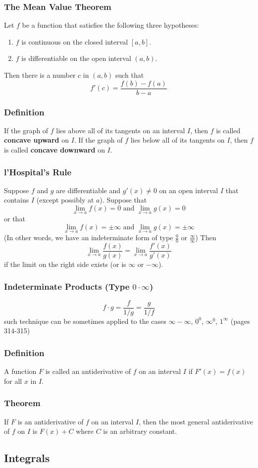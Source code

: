 \documentclass{article}
\begin{document}
\subsubsection*{The Mean Value Theorem}
Let \(f\) be a function that satisfies the following three hypotheses:
\begin{enumerate}
  \item \(f\) is continuous on the closed interval \([a,b]\).
  \item \(f\) is differentiable on the open interval \((a,b)\).
\end{enumerate}
Then there is a number \(c\) in \((a,b)\) such that 
\[
f'(c) = \frac{f(b)-f(a)}{b-a}
\]

\subsubsection*{Definition}
If the graph of \(f\) lies above all of its tangents on an interval \(I\), then \(f\) is called \textbf{concave upward} on \(I\). If the graph of \(f\) lies below all of its tangents on \(I\), then \(f\) is called \textbf{concave downward} on \(I\).

\subsubsection*{l’Hospital’s Rule}
Suppose \(f\) and \(g\) are differentiable and \(g'(x) \neq 0 \) on an open interval \(I\) that contains \(I\) (except possibly at \(a\)). Suppose that
\[
\lim_{x \to a} f(x) = 0 \text{ and } \lim_{x \to a} g(x) = 0
\]
or that 
\[
\lim_{x \to a} f(x) = \pm \infty \text{ and } \lim_{x \to a} g(x) = \pm \infty
\]
(In other words, we have an indeterminate form of type \( \frac{0}{0} \) or \( \frac{\infty}{\infty} \)) Then
\[
\lim_{x \to a} \frac{f(x)}{g(x)} = \lim_{x \to a} \frac{f'(x)}{g'(x)}
\]
if the limit on the right side exists (or is \(\infty\) or \(-\infty\)).

\subsubsection*{Indeterminate Products (Type \(0 \cdot \infty\))}
\[
f \cdot g = \frac{f}{1/g} = \frac{g}{1/f}
\]
such technique can be sometimes applied to the cases \( \infty - \infty\), \( 0^0\), \( \infty ^ 0\), \(1 ^ \infty \) (pages 314-315)

\subsubsection*{Definition}
A function \(F\) is called an antiderivative of \(f\) on an interval \(I\) if \(F'(x)=f(x)\) for all \(x\) in \(I\).

\subsubsection*{Theorem}
If \(F\) is an antiderivative of \(f\) on an interval \(I\), then the most general antiderivative of \(f\) on \(I\) is \(F(x) + C\) where \(C\) is an arbitrary constant.

\subsection*{Integrals}
\end{document}
